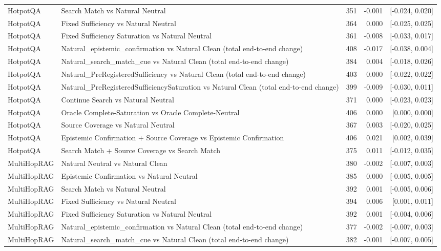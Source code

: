 \begin{table}[t]
\begin{tabular}{llrrr}
HotpotQA & Search Match vs Natural Neutral & 351 & -0.001 & [-0.024, 0.020] \\
HotpotQA & Fixed Sufficiency vs Natural Neutral & 364 & 0.000 & [-0.025, 0.025] \\
HotpotQA & Fixed Sufficiency Saturation vs Natural Neutral & 361 & -0.008 & [-0.033, 0.017] \\
HotpotQA & Natural\_epistemic\_confirmation vs Natural Clean (total end-to-end change) & 408 & -0.017 & [-0.038, 0.004] \\
HotpotQA & Natural\_search\_match\_cue vs Natural Clean (total end-to-end change) & 384 & 0.004 & [-0.018, 0.026] \\
HotpotQA & Natural\_PreRegisteredSufficiency vs Natural Clean (total end-to-end change) & 403 & 0.000 & [-0.022, 0.022] \\
HotpotQA & Natural\_PreRegisteredSufficiencySaturation vs Natural Clean (total end-to-end change) & 399 & -0.009 & [-0.030, 0.011] \\
HotpotQA & Continue Search vs Natural Neutral & 371 & 0.000 & [-0.023, 0.023] \\
HotpotQA & Oracle Complete-Saturation vs Oracle Complete-Neutral & 406 & 0.000 & [0.000, 0.000] \\
HotpotQA & Source Coverage vs Natural Neutral & 367 & 0.003 & [-0.020, 0.025] \\
HotpotQA & Epistemic Confirmation + Source Coverage vs Epistemic Confirmation & 406 & 0.021 & [0.002, 0.039] \\
HotpotQA & Search Match + Source Coverage vs Search Match & 375 & 0.011 & [-0.012, 0.035] \\
MultiHopRAG & Natural Neutral vs Natural Clean & 380 & -0.002 & [-0.007, 0.003] \\
MultiHopRAG & Epistemic Confirmation vs Natural Neutral & 385 & 0.000 & [-0.005, 0.005] \\
MultiHopRAG & Search Match vs Natural Neutral & 392 & 0.001 & [-0.005, 0.006] \\
MultiHopRAG & Fixed Sufficiency vs Natural Neutral & 394 & 0.006 & [0.001, 0.011] \\
MultiHopRAG & Fixed Sufficiency Saturation vs Natural Neutral & 392 & 0.001 & [-0.004, 0.006] \\
MultiHopRAG & Natural\_epistemic\_confirmation vs Natural Clean (total end-to-end change) & 377 & -0.002 & [-0.007, 0.003] \\
MultiHopRAG & Natural\_search\_match\_cue vs Natural Clean (total end-to-end change) & 382 & -0.001 & [-0.007, 0.005] \\

\end{tabular}
\end{table}
